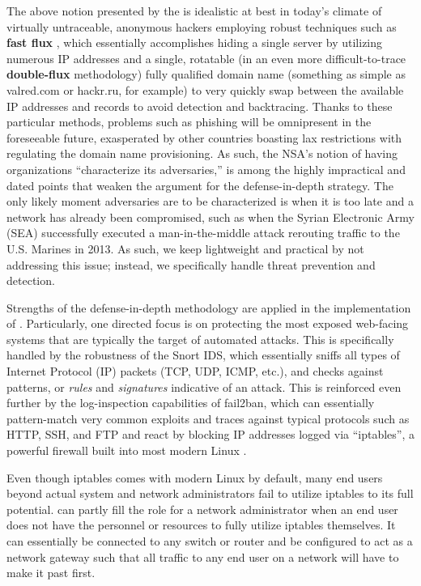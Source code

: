 \documentclass[11.5pt,letterpaper,titlepage]{report}
\begin{document}
The above notion presented by the \nsa is idealistic at best in today's climate
of virtually untraceable, anonymous hackers employing robust \dns
techniques such as \textbf{fast flux} \autocite{honey}, which essentially accomplishes hiding a
single \ctwo server by utilizing numerous IP addresses and a
single, rotatable (in an even more difficult-to-trace \textbf{double-flux} methodology)
fully qualified domain name (something as simple as valred.com or hackr.ru, for
example) to very quickly swap between the available IP addresses and \dns records
to avoid detection and backtracing.  Thanks to these particular methods,
problems such as phishing will be omnipresent in the foreseeable future,
exasperated by other countries boasting lax restrictions with regulating the
domain name provisioning.  As such, the NSA’s notion of having organizations
``characterize its adversaries,'' is among the highly impractical and dated points
that weaken the argument for the defense-in-depth strategy.  The only likely
moment adversaries are to be characterized is when it is too late and a network
has already been compromised, such as when the Syrian Electronic Army (SEA)
successfully executed a man-in-the-middle attack rerouting traffic to the U.S.
Marines \autocite{syrians} in 2013.  As such, we keep \scarletshield lightweight and practical
by not addressing this issue; instead, we specifically handle threat prevention
and detection.

Strengths of the defense-in-depth methodology are applied in the implementation
of \scarletshield.  Particularly, one directed focus is on protecting the most
exposed web-facing systems that are typically the target of automated attacks.
This is specifically handled by the robustness of the Snort IDS, which
essentially sniffs all types of Internet Protocol (IP) packets (TCP, UDP, ICMP,
etc.), and checks against patterns, or \emph{rules} and \emph{signatures} indicative of an
attack.  This is reinforced even further by the log-inspection capabilities of
fail2ban, which can essentially pattern-match very common exploits and \dos
traces against typical protocols such as HTTP, SSH, and FTP and react by
blocking IP addresses logged via ``iptables'', a powerful firewall built into most
modern Linux \distros.

Even though iptables comes with modern Linux \distros by default, many end users
beyond actual system and network administrators fail to utilize iptables to its
full potential.  \scarletshield can partly fill the role for a network
administrator when an end user does not have the personnel or resources to fully
utilize iptables themselves.  It can essentially be connected to any switch or
router and be configured to act as a network gateway such that all traffic to
any end user on a network will have to make it past \scarletshield first.
\end{document}
